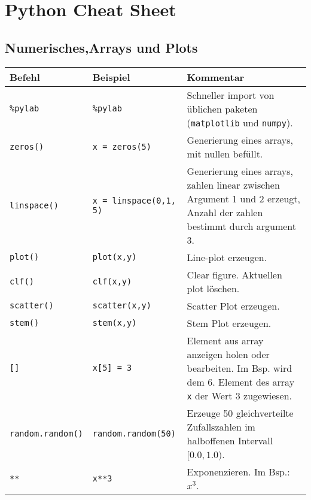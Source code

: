 

\section*{Python Cheat Sheet}
\subsection*{Numerisches,Arrays und Plots}
\begin{table}[H]
    \centering
    \begin{tabular}{|l|l|p{7cm}|}
        \hline
    \textbf{Befehl} & \textbf{Beispiel} & \textbf{Kommentar} \\ \hline
    
    \texttt{\%pylab} & \texttt{\%pylab} & Schneller import von üblichen paketen (\texttt{matplotlib} und \texttt{numpy}). \\ \hline
    \texttt{zeros()} & \texttt{x = zeros(5)} & Generierung eines arrays, mit nullen befüllt. \\ \hline
    \texttt{linspace()} & \texttt{x = linspace(0,1, 5)} & Generierung eines arrays, zahlen linear zwischen Argument 1 und 2 erzeugt, Anzahl der zahlen bestimmt durch argument 3. \\ \hline
    \texttt{plot()} & \texttt{plot(x,y)} & Line-plot erzeugen.  \\ \hline
    \texttt{clf()} & \texttt{clf(x,y)} & Clear figure. Aktuellen plot löschen.  \\ \hline
    \texttt{scatter()} & \texttt{scatter(x,y)} & Scatter Plot erzeugen. \\ \hline
    \texttt{stem()} & \texttt{stem(x,y)} & Stem Plot erzeugen. \\ \hline

    \texttt{[]} & \texttt{x[5] = 3} & Element aus array anzeigen holen oder bearbeiten. Im Bsp. wird dem 6. Element des array \texttt{x} der Wert 3 zugewiesen. \\ \hline
    \texttt{random.random()} & \texttt{random.random(50)} & Erzeuge 50 gleichverteilte Zufallszahlen im halboffenen Intervall $[0.0, 1.0)$. \\ \hline
    \texttt{**} & \texttt{x**3} & Exponenzieren. Im Bsp.: $x^3$. \\ \hline

    \end{tabular}
\end{table}

